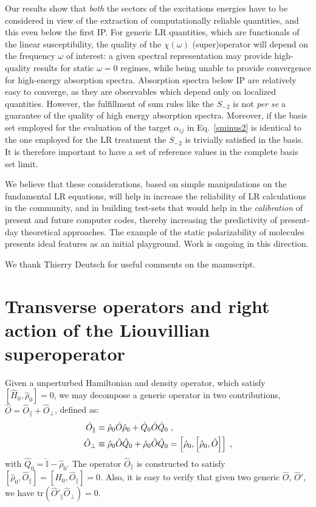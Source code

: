 \documentclass[reprint,aps,prb]{revtex4-1}
\newcommand{\nn}{\notag}
\newcommand{\lb}{\label}
\newcommand{\op}[1]{\hat {#1}}
\newcommand{\commutator}[2]{\left[ {#1} , {#2} \right]}
\newcommand{\trace}[1]{\mathrm{tr}\left(#1\right)}
\newcommand{\dmnot}{\op{\rho}_0}
\newcommand{\hnot}{\op{H}_0}
\newcommand{\identity}{\op{\mathbb I}}
\begin{document}
Our results show that \emph{both} the sectors of the excitations energies have to be considered in view of the extraction of computationally reliable quantities, and this even below the first IP.
For generic LR quantities, which are functionals of the linear susceptibility,
the quality of the $\chi(\omega)$ (super)operator will depend
on the frequency $\omega$ of interest: a given spectral representation may provide high-quality results for static $\omega=0$ regimes, while being
unable to provide convergence for high-energy absorption spectra.
Absorption spectra below IP are relatively easy to converge, as they are observables which depend only on localized quantities.
However, the fulfillment of sum rules like the $S_{-2}$ is not \textit{per se}
a guarantee of the quality of high energy absorption spectra.
Moreover, if the basis set employed for the evaluation of the target $\alpha_{ij}$ in  Eq.~\eqref{sminus2} is identical to the one employed for the LR treatment the $S_{-2}$
is trivially satisfied in the basis. It is therefore important to have a set of reference values
in the complete basis set limit.

We believe that these considerations, based on simple manipulations on the fundamental LR equations, will help in increase
the reliability of LR calculations in the community, and in building test-sets that would help in
the \emph{calibration} of present and future computer codes, thereby increasing the predictivity of present-day theoretical approaches.
The example of the static polarizability of molecules
presents ideal features as an initial playground. Work is ongoing in this direction.

\begin{acknowledgments}
We thank Thierry Deutsch for useful comments on the manuscript.
\end{acknowledgments}

\appendix
\section{Transverse operators and right action of the Liouvillian superoperator}\lb{LiouvillianAction}
Given a unperturbed Hamiltonian and density operator, which satisfy $\commutator{\hnot}{\dmnot}=0$, we may decompose a generic operator in two contributions, $\op O=\op O_\parallel + \op O_\perp$, defined as:
\begin{align}
\op O_\parallel &\equiv \dmnot \op O \dmnot + \op Q_0 \op O \op Q_0 \nn \;,\\
\op O_\perp &\equiv \dmnot \op O \op Q_0 + \dmnot \op O \op Q_0 =
\commutator{\dmnot}{\commutator{\dmnot}{\op O}} \;,
\end{align}
with $\op Q_0 =\identity - \dmnot$.
The operator $\op O_\parallel$ is constructed to satisfy
$\commutator{\dmnot}{\op O_\parallel} = \commutator{\hnot}{\op O_\parallel} =0$.
Also, it is easy to verify that given two generic $\op O$, $\op O'$, we have
$\trace{\op O'_\parallel \op O_\perp} =0$.
\end{document}
